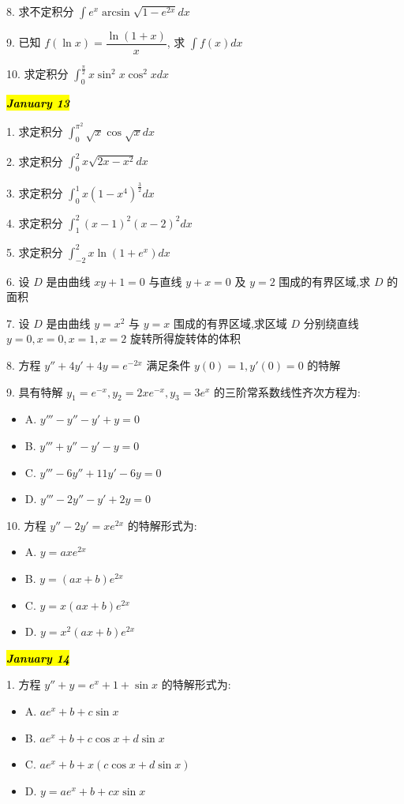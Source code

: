 8. 求不定积分 $\int e^{x}\arcsin\sqrt{1-e^{2x}}dx$

9. 已知 $f(\ln x)=\dfrac{\ln(1+x)}{x}$, 求 $\int f(x)dx$

10. 求定积分 $\int_{0}^{\frac{\pi}{2}}x\sin^{2}x\cos^{2}xdx$

\hl{\textbf{\textit{January 13}}}

1. 求定积分 $\int_{0}^{\pi^{2}}\sqrt{x}\cos\sqrt{x}dx$

2. 求定积分 $\int_{0}^{2}x\sqrt{2x-x^{2}}dx$

3. 求定积分 $\int_{0}^{1}x(1-x^{4})^{\frac{3}{2}}dx$

4. 求定积分 $\int_{1}^{2}(x-1)^{2}(x-2)^{2}dx$

5. 求定积分 $\int_{-2}^{2}x\ln(1+e^{x})dx$

6. 设 $D$ 是由曲线 $xy+1=0$ 与直线 $y+x=0$ 及 $y=2$ 围成的有界区域,求 $D$ 的面积

7. 设 $D$ 是由曲线 $y=x^{2}$ 与 $y=x$ 围成的有界区域,求区域 $D$ 分别绕直线 $y=0,x=0,x=1,x=2$ 旋转所得旋转体的体积

8. 方程 $y''+4y'+4y=e^{-2x}$ 满足条件 $y(0)=1,y'(0)=0$ 的特解

9. 具有特解 $y_{1}=e^{-x},y_{2}=2xe^{-x},y_{3}=3e^{x}$ 的三阶常系数线性齐次方程为:
\begin{itemize}
	\item A. $y'''-y''-y'+y=0$
	\item B. $y'''+y''-y'-y=0$
	\item C. $y'''-6y''+11y'-6y=0$
	\item D. $y'''-2y''-y'+2y=0$
\end{itemize}

10. 方程 $y''-2y'=xe^{2x}$ 的特解形式为:
\begin{itemize}
	\item A. $y=axe^{2x}$
	\item B. $y=(ax+b)e^{2x}$
	\item C. $y=x(ax+b)e^{2x}$
	\item D. $y=x^{2}(ax+b)e^{2x}$
\end{itemize}

\hl{\textbf{\textit{January 14}}}

1. 方程 $y''+y=e^{x}+1+\sin x$ 的特解形式为:
\begin{itemize}
	\item A. $ae^{x}+b+c\sin x$
	\item B. $ae^{x}+b+c\cos x+d\sin x$
	\item C. $ae^{x}+b+x(c\cos x+d\sin x)$
	\item D. $y=ae^{x}+b+cx\sin x$
\end{itemize}

